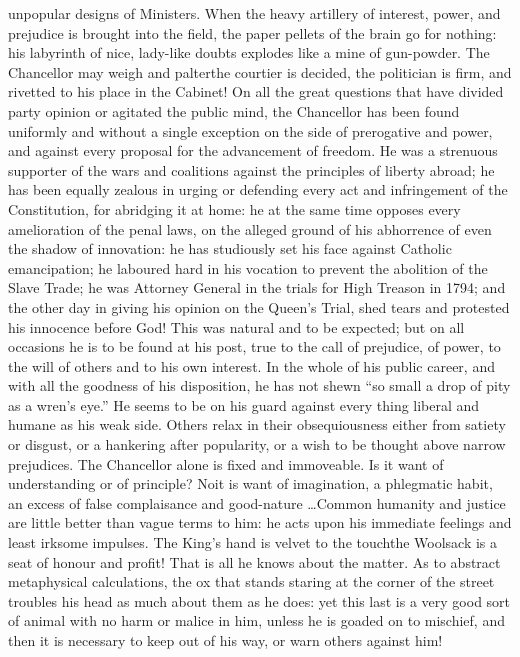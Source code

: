 unpopular designs of Ministers. When the heavy artillery of
interest, power, and prejudice is brought into the field, the
paper pellets of the brain go for nothing: his labyrinth of nice,
lady-like doubts explodes like a mine of gun-powder. The
Chancellor may weigh and palter\textemdash the courtier is
decided, the politician is firm, and rivetted to his place in the
Cabinet! On all the great questions that have divided party
opinion or agitated the public mind, the Chancellor has been found
uniformly and without a single exception on the side of
prerogative and power, and against every proposal for the
advancement of freedom. He was a strenuous supporter of the wars
and coalitions against the principles of liberty abroad; he has
been equally zealous in urging or defending every act and
infringement of the Constitution, for abridging it at home: he at
the same time opposes every amelioration of the penal laws, on the
alleged ground of his abhorrence of even the shadow of innovation:
he has studiously set his face against Catholic emancipation; he
laboured hard in his vocation to prevent the abolition of the
Slave Trade; he was Attorney General in the trials for High
Treason in 1794; and the other day in giving his opinion on the
Queen's Trial, shed tears and protested his innocence before God!
This was natural and to be expected; but on all occasions he is to
be found at his post, true to the call of prejudice, of power, to
the will of others and to his own interest.  In the whole of his
public career, and with all the goodness of his disposition, he
has not shewn ``so small a drop of pity as a wren's eye.''  He
seems to be on his guard against every thing liberal and humane as
his weak side. Others relax in their obsequiousness either from
satiety or disgust, or a hankering after popularity, or a wish to
be thought above narrow prejudices. The Chancellor alone is fixed
and immoveable.  Is it want of understanding or of principle?
No\textemdash it is want of imagination, a phlegmatic habit, an
excess of false complaisance and good-nature \ldots Common humanity
and justice are little better than vague terms to him: he acts
upon his immediate feelings and least irksome impulses. The King's
hand is velvet to the touch\textemdash the Woolsack is a seat of
honour and profit! That is all he knows about the matter. As to
abstract metaphysical calculations, the ox that stands staring at
the corner of the street troubles his head as much about them as
he does: yet this last is a very good sort of animal with no harm
or malice in him, unless he is goaded on to mischief, and then it
is necessary to keep out of his way, or warn others against him!

